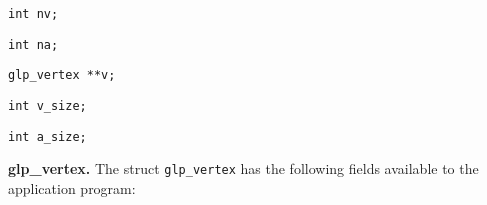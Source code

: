 \begin{comment}Symbolic name assigned to the graph. It is a pointer to
a null terminated character string of length from 1 to 255 characters.
If no name is assigned to the graph, this field contains \verb|NULL|.
\end{comment}

\medskip

\noindent
\verb|int nv;|

\begin{comment}The number of vertices in the graph, $nv\geq 0$.
\end{comment}

\medskip

\noindent
\verb|int na;|

\begin{comment}The number of arcs in the graph, $na\geq 0$.
\end{comment}

\medskip

\noindent
\verb|glp_vertex **v;|

\begin{comment}Pointer to an array containing the list of vertices.
Element $v[0]$ is not used. Element $v[i]$, $1\leq i\leq nv$, is a
pointer to $i$-th vertex of the graph. Note that on adding new vertices
to the graph the field $v$ may be altered due to reallocation. However,
pointers $v[i]$ are not changed while corresponding vertices exist in
the graph.
\end{comment}

\medskip

\noindent
\verb|int v_size;|

\begin{comment}Size of vertex data blocks, in bytes,
$0\leq v\_size\leq 256$. (See also the field \verb|data| in the struct
\verb|glp_vertex|.)
\end{comment}

\medskip

\noindent
\verb|int a_size;|

\begin{comment}Size of arc data blocks, in bytes,
$0\leq v\_size\leq 256$. (See also the field \verb|data| in the struct
\verb|glp_arc|.)
\end{comment}

\bigskip

\noindent
{\bf glp\_vertex.} The struct \verb|glp_vertex| has the following
fields available to the application program:

\medskip

